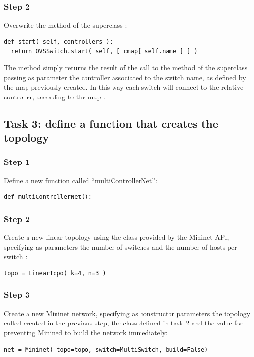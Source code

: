 \subsubsection*{Step 2}
Overwrite the method  of the superclass :
\begin{lstlisting}
def start( self, controllers ):
  return OVSSwitch.start( self, [ cmap[ self.name ] ] )
\end{lstlisting}
The method simply returns the result of the call to the method  of the
superclass passing as parameter the controller associated to the switch name, as defined by
the map  previously created. In this way each switch will connect to
the relative controller, according to the map .






\subsection*{Task 3: define a function that creates the topology}
\subsubsection*{Step 1}
Define a new function called ``multiControllerNet'':
\begin{lstlisting}
def multiControllerNet():
\end{lstlisting}

\subsubsection*{Step 2}
Create a new linear topology using the class  provided by
the Mininet API, specifying as parameters the number of switches  and the
number of hosts per switch :
\begin{lstlisting}
topo = LinearTopo( k=4, n=3 )
\end{lstlisting}

\subsubsection*{Step 3}
Create a new Mininet network, specifying as constructor parameters the topology
called  created in the previous step, the class 
defined in task 2 and the value  for preventing Minined to build
the network immediately:
\begin{lstlisting}
net = Mininet( topo=topo, switch=MultiSwitch, build=False)
\end{lstlisting}

